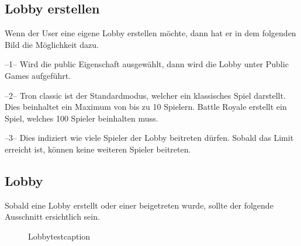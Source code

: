 \documentclass[11pt,ngerman]{article}
\begin{document}
    \subsection{Lobby erstellen}
    
    Wenn der User eine eigene Lobby erstellen möchte, dann hat er in dem folgenden Bild die Möglichkeit dazu.
    
    
    --1-- Wird die public Eigenschaft ausgewählt, dann wird die Lobby unter Public Games aufgeführt. 
    
    --2-- Tron classic ist der Standardmodus, welcher ein klassisches Spiel darstellt. Dies beinhaltet ein Maximum von bis zu 10 Spielern. Battle Royale erstellt ein Spiel, welches 100 Spieler beinhalten muss.
    
    --3-- Dies indiziert wie viele Spieler der Lobby beitreten dürfen. Sobald das Limit erreicht ist, können keine weiteren Spieler beitreten.
    
	\subsection{Lobby}
	
	Sobald eine Lobby erstellt oder einer beigetreten wurde, sollte der folgende Ausschnitt ersichtlich sein.
    \begin{figure}[H]
    	\centering
    	\caption{Lobbytestcaption}
    	\label{fig:Lobbytest_caption}
    \end{figure}
  
\end{document}
